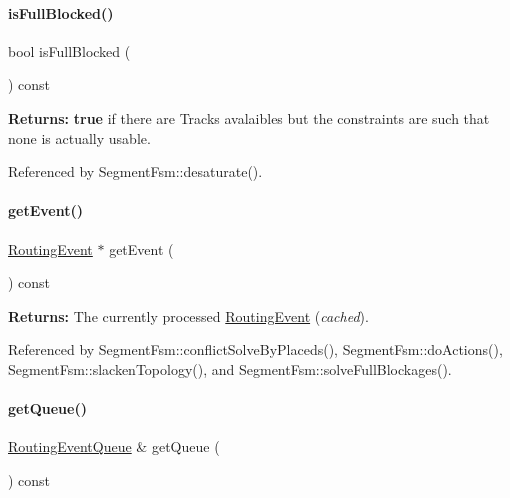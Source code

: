 \paragraph{\texorpdfstring{is\+Full\+Blocked()}{isFullBlocked()}}
{\footnotesize\ttfamily bool is\+Full\+Blocked (\begin{DoxyParamCaption}{ }\end{DoxyParamCaption}) const\hspace{0.3cm}{\ttfamily [inline]}}

{\bfseries Returns\+:} {\bfseries true} if there are Tracks avalaibles but the constraints are such that none is actually usable. 

Referenced by Segment\+Fsm\+::desaturate().

\mbox{\label{classKite_1_1SegmentFsm_a513f39c546ef4be0d13787cdace4eadf}} 
\paragraph{\texorpdfstring{get\+Event()}{getEvent()}}
{\footnotesize\ttfamily \hyperlink{classKite_1_1RoutingEvent}{Routing\+Event} $\ast$ get\+Event (\begin{DoxyParamCaption}{ }\end{DoxyParamCaption}) const\hspace{0.3cm}{\ttfamily [inline]}}

{\bfseries Returns\+:} The currently processed \hyperlink{classKite_1_1RoutingEvent}{Routing\+Event} ({\itshape cached}). 

Referenced by Segment\+Fsm\+::conflict\+Solve\+By\+Placeds(), Segment\+Fsm\+::do\+Actions(), Segment\+Fsm\+::slacken\+Topology(), and Segment\+Fsm\+::solve\+Full\+Blockages().

\mbox{\label{classKite_1_1SegmentFsm_a3e86badede6ba842280779cecea21e81}} 
\paragraph{\texorpdfstring{get\+Queue()}{getQueue()}}
{\footnotesize\ttfamily \hyperlink{classKite_1_1RoutingEventQueue}{Routing\+Event\+Queue} \& get\+Queue (\begin{DoxyParamCaption}{ }\end{DoxyParamCaption}) const\hspace{0.3cm}{\ttfamily [inline]}}

